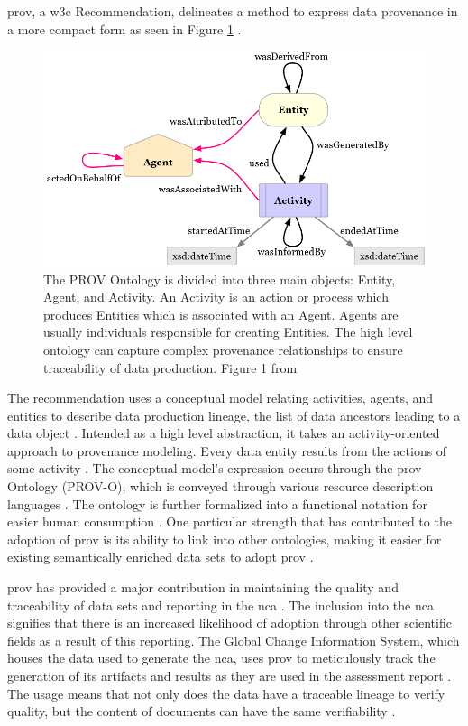 \gls{prov}, a \gls{w3c} Recommendation, delineates a method to express data provenance in a more compact form as seen in Figure \ref{PROVO} \cite{Gil2013a} \cite{Groth2013}.
\begin{figure}
	\centering
	\includegraphics[scale=0.5]{figures/ProvO.png}
	\caption[Diagram of the PROV Ontology.]{The PROV Ontology is divided into three main objects: Entity, Agent, and Activity.  An Activity is an action or process which produces Entities which is associated with an Agent.  Agents are usually individuals responsible for creating Entities.  The high level ontology can capture complex provenance relationships to ensure traceability of data production.  Figure 1 from \cite{Lebo2013}}
	\label{PROVO}
\end{figure}
The recommendation uses a conceptual model relating activities, agents, and entities to describe data production lineage, the list of data ancestors leading to a data object \cite{Moreau2013c} \cite{Nies2013} \cite{Nies2013a}.
Intended as a high level abstraction, it takes an activity-oriented approach to provenance modeling.
Every data entity results from the actions of some activity \cite{Gil2013}.
The conceptual model's expression occurs through the \gls{prov} Ontology (PROV-O), which is conveyed through various resource description languages \cite{Hua2013} \cite{Klyne2013}.
The ontology is further formalized into a functional notation for easier human consumption \cite{Moreau2013b} \cite{Cheney2013a}.
One particular strength that has contributed to the adoption of \gls{prov} is its ability to link into other ontologies, making it easier for existing semantically enriched data sets to adopt \gls{prov} \cite{Miles2013} \cite{Moreau2013}.

\gls{prov} has provided a major contribution in maintaining the quality and traceability of data sets and reporting in the \gls{nca} \cite{Ma2014191}.
The inclusion into the \gls{nca} signifies that there is an increased likelihood of adoption through other scientific fields as a result of this reporting.
The Global Change Information System, which houses the data used to generate the \gls{nca}, uses \gls{prov} to meticulously track the generation of its artifacts and results as they are used in the assessment report \cite{Tilmes2012}.
The usage means that not only does the data have a traceable lineage to verify quality, but the content of documents can have the same verifiability \cite{Ma2014}.

